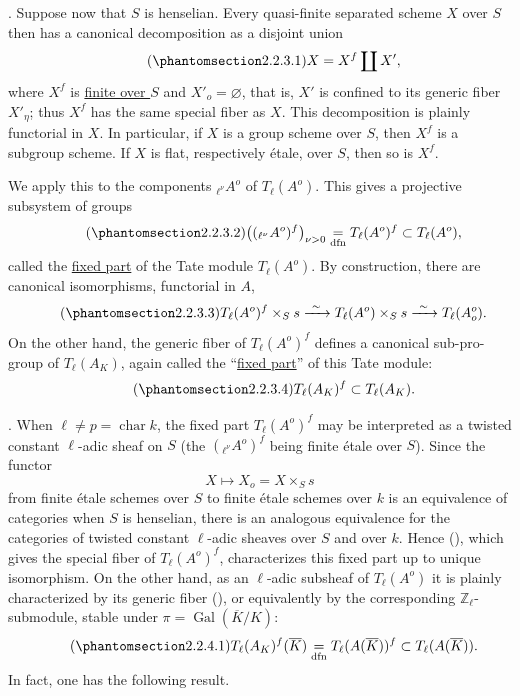 \medskip
\noindent
{}. Suppose now that $S$ is henselian.  Every quasi-finite separated
scheme $X$ over $S$ then has a canonical decomposition as a disjoint
union
\begin{equation}\tag{\SGARefTarget{sga7.sga7i.eix.n2-2-3-1}{2.2.3.1}}
 X=X^f\coprod X',
\end{equation}
where $X^f$ is \underline{finite over $S$} and $X'_o=\varnothing$, that
is, $X'$ is confined to its generic fiber $X'_\eta$; thus $X^f$ has the
same special fiber as $X$.  This decomposition is plainly functorial in
$X$.  In particular, if $X$ is a group scheme over $S$, then $X^f$ is
a subgroup scheme.  If $X$ is flat, respectively \'{e}tale, over $S$,
then so is $X^f$.

We apply this to the components ${}_{\ell^\nu}A^o$ of $T_\ell(A^o)$.
This gives a projective subsystem of groups
\begin{equation}\tag{\SGARefTarget{sga7.sga7i.eix.n2-2-3-2}{2.2.3.2}}
 \bigl(({}_{\ell^\nu}A^o)^f\bigr)_{\nu>0}
 \underset{\mathrm{dfn}}{=}T_\ell(A^o)^f
 \subset T_\ell(A^o),
\end{equation}
called the \underline{fixed part} of the Tate module $T_\ell(A^o)$.
By construction, there are canonical isomorphisms, functorial in $A$,
\begin{equation}\tag{\SGARefTarget{sga7.sga7i.eix.n2-2-3-3}{2.2.3.3}}
 T_\ell(A^o)^f\times_S s\xrightarrow{\ \sim\ }
 T_\ell(A^o)\times_Ss\xrightarrow{\ \sim\ }T_\ell(A_o^o).
\end{equation}
On the other hand, the generic fiber of $T_\ell(A^o)^f$ defines a
canonical sub-pro-group of $T_\ell(A_K)$, again called the
``\underline{fixed part}'' of this Tate module:
\begin{equation}\tag{\SGARefTarget{sga7.sga7i.eix.n2-2-3-4}{2.2.3.4}}
 T_\ell(A_K)^f\subset T_\ell(A_K).
\end{equation}

\medskip
\noindent
{}. When $\ell\ne p=\operatorname{char}k$, the fixed part
$T_\ell(A^o)^f$ may be interpreted as a twisted constant $\ell$-adic
sheaf on $S$ (the $({}_{\ell^\nu}A^o)^f$ being finite \'{e}tale over
$S$).  Since the functor
\[
 X\longmapsto X_o=X\times_Ss
\]
from finite \'{e}tale schemes over $S$ to finite \'{e}tale schemes
over $k$ is an equivalence of categories when $S$ is henselian, there
is an analogous equivalence for the categories of twisted constant
$\ell$-adic sheaves over $S$ and over $k$.  Hence (), which
gives the special fiber of $T_\ell(A^o)^f$, characterizes this fixed
part up to unique isomorphism.  On the other hand, as an $\ell$-adic
subsheaf of $T_\ell(A^o)$ it is plainly characterized by its generic
fiber (), or equivalently by the corresponding
$\mathbb Z_\ell$-submodule, stable under
$\pi=\operatorname{Gal}(\overline K/K)$:
\begin{equation}\tag{\SGARefTarget{sga7.sga7i.eix.n2-2-4-1}{2.2.4.1}}
 T_\ell(A_K)^f(\overline K)
 \underset{\mathrm{dfn}}{=}T_\ell(A(\overline K))^f
 \subset T_\ell(A(\overline K)).
\end{equation}
In fact, one has the following result.

